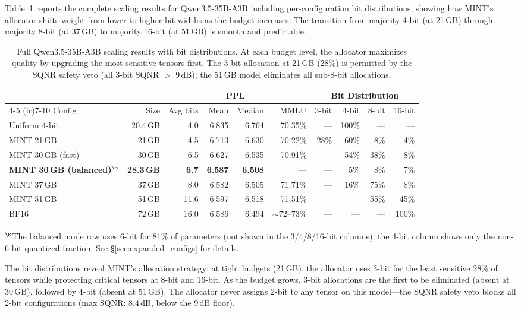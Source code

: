 \documentclass{article}
\begin{document}
Table~\ref{tab:qwen35_full} reports the complete scaling results for Qwen3.5-35B-A3B including per-configuration bit distributions, showing how MINT's allocator shifts weight from lower to higher bit-widths as the budget increases. The transition from majority 4-bit (at 21\,GB) through majority 8-bit (at 37\,GB) to majority 16-bit (at 51\,GB) is smooth and predictable.

\begin{table}[h]
\centering
\small
\caption{Full Qwen3.5-35B-A3B scaling results with bit distributions. At each budget level, the allocator maximizes quality by upgrading the most sensitive tensors first. The 3-bit allocation at 21\,GB (28\%) is permitted by the SQNR safety veto (all 3-bit SQNR $>$ 9\,dB); the 51\,GB model eliminates all sub-8-bit allocations.}
\label{tab:qwen35_full}
\begin{tabular}{lrrrrrrrrr}
\toprule
& & & \multicolumn{2}{c}{PPL} & & \multicolumn{4}{c}{Bit Distribution} \\
\cmidrule(lr){4-5} \cmidrule(lr){7-10}
Config & Size & Avg bits & Mean & Median & MMLU & 3-bit & 4-bit & 8-bit & 16-bit \\
\midrule
Uniform 4-bit & 20.4\,GB & 4.0 & 6.835 & 6.764 & 70.35\% & --- & 100\% & --- & --- \\
MINT 21\,GB & 21\,GB & 4.5 & 6.713 & 6.630 & 70.22\% & 28\% & 60\% & 8\% & 4\% \\
MINT 30\,GB (fast) & 30\,GB & 6.5 & 6.627 & 6.535 & 70.91\% & --- & 54\% & 38\% & 8\% \\
\textbf{MINT 30\,GB (balanced)}$^\S$ & \textbf{28.3\,GB} & \textbf{6.7} & \textbf{6.587} & \textbf{6.508} & --- & --- & 5\% & 8\% & 7\% \\
MINT 37\,GB & 37\,GB & 8.0 & 6.582 & 6.505 & 71.71\% & --- & 16\% & 75\% & 8\% \\
MINT 51\,GB & 51\,GB & 11.6 & 6.597 & 6.518 & 71.51\% & --- & --- & 55\% & 45\% \\
BF16 & 72\,GB & 16.0 & 6.586 & 6.494 & ${\sim}$72--73\% & --- & --- & --- & 100\% \\
\bottomrule
\end{tabular}
\end{table}

$^\S$The balanced mode row uses 6-bit for 81\% of parameters (not shown in the 3/4/8/16-bit columns); the 4-bit column shows only the non-6-bit quantized fraction. See \S\ref{sec:expanded_configs} for details.

The bit distributions reveal MINT's allocation strategy: at tight budgets (21\,GB), the allocator uses 3-bit for the least sensitive 28\% of tensors while protecting critical tensors at 8-bit and 16-bit. As the budget grows, 3-bit allocations are the first to be eliminated (absent at 30\,GB), followed by 4-bit (absent at 51\,GB). The allocator never assigns 2-bit to any tensor on this model---the SQNR safety veto blocks all 2-bit configurations (max SQNR: 8.4\,dB, below the 9\,dB floor).
\end{document}
